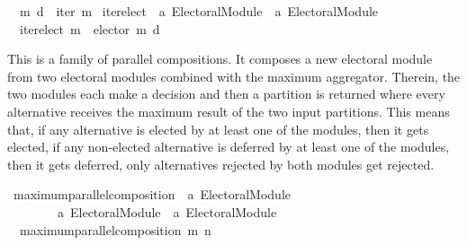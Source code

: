 \begin{isabellebody}
\ \ {\isachardoublequoteopen}m\ {\isasymcirclearrowleft}\isactrlsub {\isasymexists}\isactrlsub {\isacharbang}{\kern0pt}\isactrlsub d\ {\isasymequiv}\ iter\ m{\isachardoublequoteclose}\isanewline
\isanewline
{}\isamarkupfalse%
\ iterelect\ {\isacharcolon}{\kern0pt}{\isacharcolon}{\kern0pt}\ {\isachardoublequoteopen}{\isacharprime}{\kern0pt}a\ Electoral{\isacharunderscore}{\kern0pt}Module\ {\isasymRightarrow}\ {\isacharprime}{\kern0pt}a\ Electoral{\isacharunderscore}{\kern0pt}Module{\isachardoublequoteclose}\ \isanewline
\ \ {\isachardoublequoteopen}iterelect\ m\ {\isacharequal}{\kern0pt}\ elector\ {\isacharparenleft}{\kern0pt}m\ {\isasymcirclearrowleft}\isactrlsub {\isasymexists}\isactrlsub {\isacharbang}{\kern0pt}\isactrlsub d{\isacharparenright}{\kern0pt}{\isachardoublequoteclose}%
\isadelimdocument
%
\endisadelimdocument
%
\isatagdocument
%
\isamarkuptrue%
%
\endisatagdocument
{\isafolddocument}%
%
\isadelimdocument
%
\endisadelimdocument
%
\begin{isamarkuptext}%
This is a family of parallel compositions. It composes a new electoral module
from two electoral modules combined with the maximum aggregator. Therein, the
two modules each make a decision and then a partition is returned where every
alternative receives the maximum result of the two input partitions. This means
that, if any alternative is elected by at least one of the modules, then it
gets elected, if any non-elected alternative is deferred by at least one of the
modules, then it gets deferred, only alternatives rejected by both modules get
rejected.%
\end{isamarkuptext}\isamarkuptrue%
%
\isadelimdocument
%
\endisadelimdocument
%
\isatagdocument
%
\isamarkuptrue%
%
\endisatagdocument
{\isafolddocument}%
%
\isadelimdocument
%
\endisadelimdocument
{}\isamarkupfalse%
\ maximum{\isacharunderscore}{\kern0pt}parallel{\isacharunderscore}{\kern0pt}composition\ {\isacharcolon}{\kern0pt}{\isacharcolon}{\kern0pt}\ {\isachardoublequoteopen}{\isacharprime}{\kern0pt}a\ Electoral{\isacharunderscore}{\kern0pt}Module\ {\isasymRightarrow}\isanewline
\ \ \ \ \ \ \ \ {\isacharprime}{\kern0pt}a\ Electoral{\isacharunderscore}{\kern0pt}Module\ {\isasymRightarrow}\ {\isacharprime}{\kern0pt}a\ Electoral{\isacharunderscore}{\kern0pt}Module{\isachardoublequoteclose}\ \isanewline
\ \ {\isachardoublequoteopen}maximum{\isacharunderscore}{\kern0pt}parallel{\isacharunderscore}{\kern0pt}composition\ m\ n\ {\isacharequal}{\kern0pt}\isanewline

\end{isabellebody}
